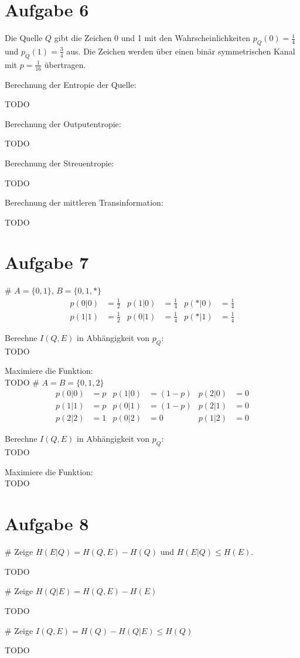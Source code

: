 

\section*{Aufgabe 6}
Die Quelle $Q$ gibt die Zeichen 0 und 1 mit den Wahrscheinlichkeiten $p_Q(0) = \frac{1}{4}$ und $p_Q(1) = \frac{3}{4}$ aus.
Die Zeichen werden über einen binär symmetrischen Kanal mit $p = \frac{1}{16}$ übertragen.
\medskip

Berechnung der Entropie der Quelle:

TODO

Berechnung der Outputentropie:

TODO

Berechnung der Streuentropie:

TODO

Berechnung der mittleren Transinformation:

TODO

\section*{Aufgabe 7}
\begin{myList}
#
$A = \lbrace 0,1 \rbrace$, $B = \lbrace 0,1,\ast \rbrace$
\begin{align*}
	p(0|0) &= \frac{1}{2} & p(1|0) &= \frac{1}{4} & p(\ast|0) &= \frac{1}{4} \\
	p(1|1) &= \frac{1}{2} & p(0|1) &= \frac{1}{4} & p(\ast|1) &= \frac{1}{4} 
\end{align*}

Berechne $I(Q,E)$ in Abhängigkeit von $p_Q$:\\
TODO

Maximiere die Funktion:\\
TODO
#
$A = B = \lbrace 0,1,2 \rbrace$
\begin{align*}
	p(0|0) &= p & p(1|0) &= (1-p) & p(2|0) &= 0 \\
	p(1|1) &= p & p(0|1) &= (1-p) & p(2|1) &= 0 \\
	p(2|2) &= 1 & p(0|2) &= 0 & p(1|2) &= 0
\end{align*}

Berechne $I(Q,E)$ in Abhängigkeit von $p_Q$:\\
TODO

Maximiere die Funktion:\\
TODO
\end{myList}

\section*{Aufgabe 8}
\begin{myList}
#
Zeige $H(E|Q) = H(Q,E) - H(Q)$ und $H(E|Q) \leq H(E)$.

TODO

#
Zeige $H(Q|E) = H(Q,E) - H(E)$

TODO

#
Zeige $I(Q,E) = H(Q) - H(Q|E) \leq H(Q)$

TODO

\end{myList}

